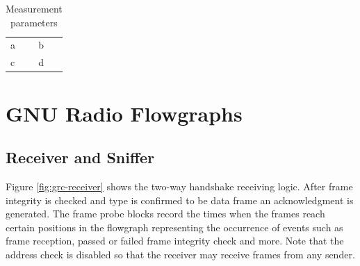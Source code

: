 \begin{table}
	\label{tab:measurement-parameters}
	\begin{center}
		\begin{tabular}{p{3.5cm}p{10cm}}
			\toprule
			a & b \\
			c & d \\
			\bottomrule	
		\end{tabular}\caption{Measurement parameters}
	\end{center}
\end{table}


\section{GNU Radio Flowgraphs}

%
%

\subsection{Receiver and Sniffer}

Figure \ref{fig:grc-receiver} shows the two-way handshake receiving logic. After frame integrity is checked and type is confirmed to be data frame an acknowledgment is generated. The frame probe blocks record the times when the frames reach certain positions in the flowgraph representing the occurrence of events such as frame reception, passed or failed frame integrity check and more. Note that the address check is disabled so that the receiver may receive frames from any sender.

